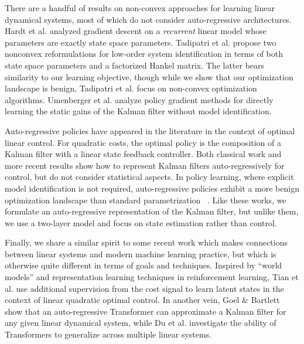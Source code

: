 \documentclass[11pt]{article}
\renewcommand{\cite}{\citep}
\newcommand{\<}{\langle}
\renewcommand{\>}{\rangle}
\numberwithin{equation}{section}
\begin{document}
There are a handful of results on non-convex approaches for learning linear dynamical systems, most of which do not consider auto-regressive architectures. 
Hardt et al.
\cite{hardt2018gradient} analyzed gradient descent on a \emph{recurrent} linear model whose parameters are exactly state space parameters. 
Tadipatri et al.
\cite{tadipatri2025nonconvex} propose two nonconvex reformulations for low-order system identification in terms of both state space parameters and a factorized Hankel matrix. 
The latter bears similarity to our learning objective,
though while we show that our optimization landscape is benign, Tadipatri et al. focus on non-convex optimization algorithms.
Umenberger et al.
\cite{umenberger2022globally} analyze policy gradient methods for directly learning the static gains of the Kalman filter without model identification.


Auto-regressive policies have appeared in the literature in the context of  optimal linear control. For quadratic costs, the optimal policy is the composition of a Kalman filter with a linear state feedback controller.
Both classical work \cite{skelton1994data} and more recent results
\cite{al2022behavioral, guo2023imitation} show how to represent Kalman filters auto-regressively for control, but do not consider statistical aspects.
In policy learning, where explicit model identification is not required,
auto-regressive policies exhibit a more benign optimization landscape than standard parametrization~
\cite{fallah2025gradient,zhao2023globally,xie2024data}.
Like these works, we formulate an auto-regressive representation of the Kalman filter,
but unlike them, we use a two-layer model and focus on state estimation rather than control.

Finally, we share a similar spirit to some recent work which makes connections between linear systems and modern machine learning practice, but which is otherwise quite different in terms of goals and techniques. 
Inspired by ``world models'' and representation learning techniques in reinforcement learning,
Tian et al. \cite{tian2023can,tian2023toward} 
use additional supervision from the cost signal to learn latent states in the context of linear quadratic optimal control.
In another vein, Goel \& Bartlett
\cite{goel2024can} show that an auto-regressive Transformer can approximate a Kalman filter for any given linear dynamical system,
while Du et al. \cite{du2023can} investigate the ability of Transformers to generalize across multiple linear systems.
%
\end{document}
